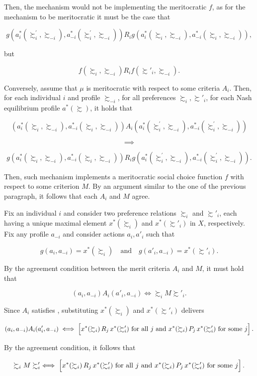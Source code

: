 \begin{implproof}
	Then, the mechanism would not be implementing the meritocratic \( f \), as for the mechanism to be meritocratic it must be the case that

	\[
		g (a_i^*(\succsim_i^{\prime}, \succsim_{-i}), a_{-i}^*(\succsim_i^{\prime}, \succsim_{-i})) R_i g (a_i^*(\succsim_i, \succsim_{-i}), a_{-i}^*(\succsim_i, \succsim_{-i}) ) ,
	\]

	but

	\[ f (\succsim_i, \succsim_{-i}) R_i f (\succsim'_i, \succsim_{-i} ) . \]

	Conversely, assume that \( \mu \) is meritocratic with respect to some criteria \( A_i \). Then, for each individual \( i \) and profile \( \succsim_{-i} \), for all preferences \( \succsim_i, \succsim'_i \), for each Nash equilibrium profile \( a^{*} ( \succsim ) \), it holds that

	\[
		( a_i^*(\succsim_i, \succsim_{-i}), a_{-i}^*(\succsim_i, \succsim_{-i}) ) A_i ( a_i^*(\succsim_i^{\prime}, \succsim_{-i}), a_{-i}^*(\succsim_i^{\prime}, \succsim_{-i}) )
	\]

	\[ \implies \]

	\[
		g ( a_i^*(\succsim_i, \succsim_{-i}), a_{-i}^*(\succsim_i, \succsim_{-i}) ) R_i g ( a_i^*(\succsim_i^{\prime}, \succsim_{-i}), a_{-i}^*(\succsim_i^{\prime}, \succsim_{-i}) ) .
	\]

	Then, such mechanism implements a meritocratic social choice function \( f \) with respect to some criterion \( M \). By an argument similar to the one of the previous paragraph, it follows that each \( A_i \) and \( M \) agree.
\end{implproof}

\begin{paretoproof}
	Fix an individual \( i \) and consider two preference relations \( \succsim_i \) and \( \succsim'_i \), each having a unique maximal element \( x^{*}(\succsim_i) \) and \( x^{*}(\succsim'_i) \) in \( X \), respectively. Fix any profile \( a_{-i} \) and consider actions \( a_i, a'_i \) such that

	\[
		g(a_i,a_{-i}) = x^{*}(\succsim_i) \quad \text{and} \quad g(a'_i,a_{-i}) = x^{*}(\succsim'_i).
	\]

	By the agreement condition between the merit criteria \( A_i \) and \( M \), it must hold that

	\[
		(a_i,a_{-i}) A_i (a'_i,a_{-i}) \iff \succsim_i M \succsim'_i.
	\]

	Since \( A_i \) satisfies , substituting \( x^{*}(\succsim_i) \) and \( x^{*}(\succsim'_i) \) delivers

	\[
		(a_i,a_{-i}) A_i (a'_i,a_{-i}) \iff \Bigl[ x^{*}(\succsim_i) \, R_j \, x^{*}(\succsim'_i) \text{ for all } j \text{ and } x^{*}(\succsim_i) \, P_j \, x^{*}(\succsim'_i) \text{ for some } j \Bigr]\,.
	\]

	By the agreement condition, it follows that

	\[
		\succsim_i M \succsim'_i \iff \Bigl[ x^{*}(\succsim_i) \, R_j \, x^{*}(\succsim'_i) \text{ for all } j \text{ and } x^{*}(\succsim_i) \, P_j \, x^{*}(\succsim'_i) \text{ for some } j \Bigr]\,.
	\]
\end{paretoproof}

